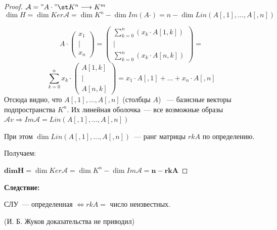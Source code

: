 \begin{proof}
    $\mathcal{A} = "A \cdot" \st K^n \longrightarrow K^m$
    \[
    \dim H = \dim Ker \mathcal{A} = \dim K^n - \dim Im (A \mathbf{\cdot}) =
    n - \dim Lin\left(A[ , 1], \ldots, A[ , n] \right)
    \]
    
    \[
    A \cdot \begin{pmatrix} x_1 \\ | \\ x_n \end{pmatrix} = 
    \begin{pmatrix}
    \sum^n_{k=0}\left(x_k \cdot A[1,k] \right) \\
    | \\
    \sum^n_{k=0}\left(x_k \cdot A[n,k] \right)
    \end{pmatrix} =
    \]
    \vspace{1\baselineskip}
    \[
    \sum^n_{k=0} x_k \cdot
    \begin{pmatrix}
     A[1,k] \\
    | \\
    A[n,k]
    \end{pmatrix} =
    x_1 \cdot A[, 1] + \ldots + x_n \cdot A[, n]
    \]
    Отсюда видно, что $A[ , 1], \ldots, A[ , n]$ (столбцы $A$) ~--- базисные векторы подпространства $K^n$. 
    Их линейная оболочка~--- все возможные образы $\mathcal{A}v \Rightarrow Im \mathcal{A} = Lin\left(A[ , 1], \ldots, A[ , n] \right)$
    
    При этом $\dim Lin\left(A[ , 1], \ldots, A[ , n] \right)$~--- ранг матрицы $rk A$ по определению.

    Получаем:

    $\mathbf{dim H} = \dim Ker \mathcal{A} = \dim K^n - \dim Im \mathcal{A} = \mathbf{n - rk A}$
\end{proof}

\textbf{Следствие:}

СЛУ~--- определенная $\Longleftrightarrow rk A =$ число неизвестных.

(И. Б. Жуков доказательства не приводил)

